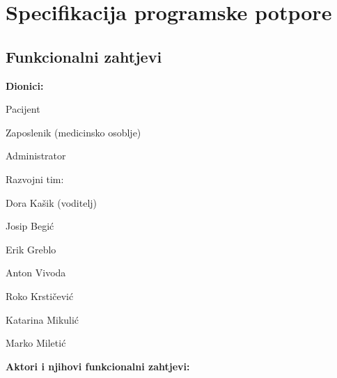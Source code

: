 \chapter{Specifikacija programske potpore}
		
	\section{Funkcionalni zahtjevi}
			

			\noindent \textbf{Dionici:}
			
			\begin{packed_enum}
				
				\item Pacijent
				\item Zaposlenik (medicinsko osoblje)				
				\item Administrator
                \item Razvojni tim:
                    \begin{packed_item}
                        \item Dora Kašik (voditelj)
                        \item Josip Begić
                        \item Erik Greblo
                        \item Anton Vivoda
                        \item Roko Krstičević
                        \item Katarina Mikulić
                        \item Marko Miletić
                    \end{packed_item}
				
			\end{packed_enum}
			
			\noindent \textbf{Aktori i njihovi funkcionalni zahtjevi:}
			
